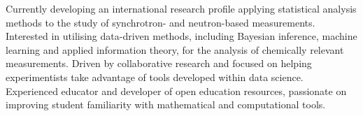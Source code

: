 \vspace{0.25cm}

\begin{cvparagraph}

Currently developing an international research profile applying statistical analysis methods to the study of synchrotron- and neutron-based measurements. 
Interested in utilising data-driven methods, including Bayesian inference, machine learning and applied information theory, for the analysis of chemically relevant measurements.
Driven by collaborative research and focused on helping experimentists take advantage of tools developed within data science. 
Experienced educator and developer of open education resources, passionate on improving student familiarity with mathematical and computational tools.
\end{cvparagraph}